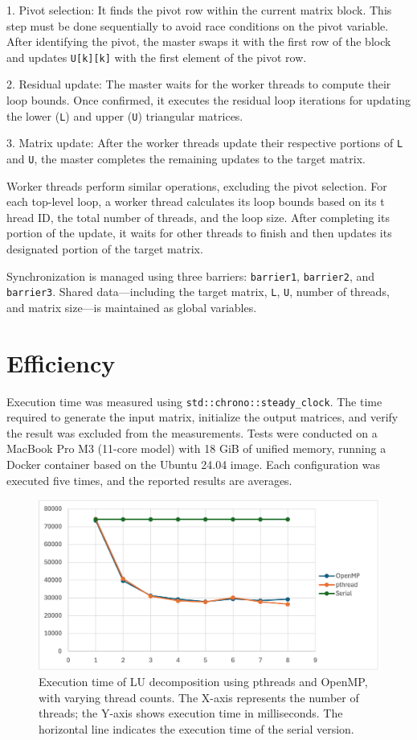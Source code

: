 \documentclass{article}
\begin{document}
1. Pivot selection: It finds the pivot row within the current matrix block. 
This step must be done sequentially to avoid race conditions on the pivot 
variable. After identifying the pivot, the master swaps it with the first row of 
the block and updates \verb|U[k][k]| with the first element of the pivot row.

2. Residual update: The master waits for the worker threads to compute their 
loop bounds. Once confirmed, it executes the residual loop iterations for 
updating the lower (\verb|L|) and upper (\verb|U|) triangular matrices.

3. Matrix update: After the worker threads update their respective portions 
of \verb|L| and \verb|U|, the master completes the remaining updates to the 
target matrix.

Worker threads perform similar operations, excluding the pivot selection. For 
each top-level loop, a worker thread calculates its loop bounds based on its t
hread ID, the total number of threads, and the loop size. After completing its 
portion of the update, it waits for other threads to finish and then updates its 
designated portion of the target matrix.

Synchronization is managed using three barriers: \verb|barrier1|, 
\verb|barrier2|, and \verb|barrier3|. Shared data—including the target matrix, 
\verb|L|, \verb|U|, number of threads, and matrix size—is maintained as global 
variables.

\section{Efficiency}

Execution time was measured using \verb|std::chrono::steady_clock|. The time 
required to generate the input matrix, initialize the output matrices, and 
verify the result was excluded from the measurements. Tests were conducted on a 
MacBook Pro M3 (11-core model) with 18 GiB of unified memory, running a Docker 
container based on the Ubuntu 24.04 image. Each configuration was executed five 
times, and the reported results are averages.

\begin{figure}[h]
\centering
\includegraphics[width=.75\textwidth]{figure1.png}
\caption{
    Execution time of LU decomposition using pthreads and OpenMP, with varying 
    thread counts. The X-axis represents the number of threads; the Y-axis shows 
    execution time in milliseconds. The horizontal line indicates the execution 
    time of the serial version.
}
\end{figure}
\end{document}
